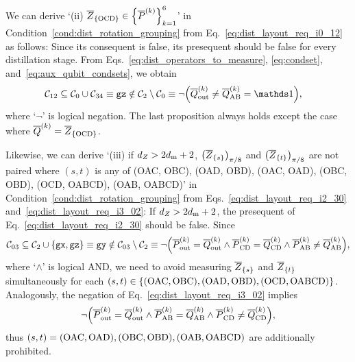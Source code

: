 \documentclass[
 prx,
 reprint,
 superscriptaddress,
 longbibliography,
 dvipsnames
]{revtex4-2}
\begin{document}
\begin{widetext}
We can derive `(ii) $\overline{Z}_\qty{\text{OCD}} \in \qty{\overline{P}^{(k)}}_{k=1}^6$' in Condition~\ref{cond:dist_rotation_grouping} from Eq.~\eqref{eq:dist_layout_req_i0_12} as follows:
Since its consequent is false, its presequent should be false for every distillation stage.
From Eqs.~\eqref{eq:dist_operators_to_measure}, \eqref{eq:condset}, and~\eqref{eq:aux_qubit_condsets}, we obtain
\begin{align*}
    \condsete{12} \subseteq \condsete{0} \cup \condsete{34} &\equiv  \gz \notin \condsete{2}\setminus\condsete{0} \equiv \neg\qty(\lgc{Q}_\mr{out}^{(k)} \neq \lgc{Q}_\mr{AB}^{(k)} = \identity),
\end{align*}
where `$\neg$' is logical negation.
The last proposition always holds except the case where $\overline{Q}^{(k)} = \overline{Z}_\qty{\text{OCD}}$.

Likewise, we can derive `(iii) if ${d_Z} > 2d_{\mathrm{m}} + 2$, $\qty(\overline{Z}_\qty{s})_{\pi/8}$ and $\qty(\overline{Z}_\qty{t})_{\pi/8}$ are not paired where $(s,t)$ is any of (OAC, OBC), (OAD, OBD), (OAC, OAD), (OBC, OBD), (OCD, OABCD), (OAB, OABCD)' in Condition~\ref{cond:dist_rotation_grouping} from Eqs.~\eqref{eq:dist_layout_req_i2_30} and~\eqref{eq:dist_layout_req_i3_02}:
If ${d_Z} > 2d_{\mathrm{m}} + 2$, the presequent of Eq.~\eqref{eq:dist_layout_req_i2_30} should be false.
Since
\begin{align*}
    \mathcal{C}_{03} \subseteq \mathcal{C}_{2} \cup \qty{\texttt{gx}, \texttt{gz}} \equiv \texttt{gy} \notin \mathcal{C}_{03}\setminus\mathcal{C}_{2} \equiv \neg \qty(\overline{P}^{(k)}_{\mathrm{out}} = \overline{Q}^{(k)}_{\mathrm{out}} \land \overline{P}^{(k)}_{\mathrm{CD}} = \overline{Q}^{(k)}_{\mathrm{CD}} \land \overline{P}^{(k)}_{\mathrm{AB}} \neq \overline{Q}^{(k)}_{\mathrm{AB}}),
\end{align*}
where `$\land$' is logical AND, we need to avoid measuring $\overline{Z}_\qty{s}$ and $\overline{Z}_\qty{t}$ simultaneously for each $(s, t) \in \qty{(\mathrm{OAC}, \mathrm{OBC}), (\mathrm{OAD}, \mathrm{OBD}), (\mathrm{OCD}, \mathrm{OABCD})}$.
Analogously, the negation of Eq.~\eqref{eq:dist_layout_req_i3_02} implies
\begin{align*}
    \neg \qty(\overline{P}^{(k)}_{\mathrm{out}} = \overline{Q}^{(k)}_{\mathrm{out}} \land \overline{P}^{(k)}_{\mathrm{AB}} = \overline{Q}^{(k)}_{\mathrm{AB}} \land \overline{P}^{(k)}_{\mathrm{CD}} \neq \overline{Q}^{(k)}_{\mathrm{CD}}),
\end{align*}
thus $(s, t)=(\mathrm{OAC}, \mathrm{OAD}), (\mathrm{OBC}, \mathrm{OBD}), (\mathrm{OAB}, \mathrm{OABCD})$ are additionally prohibited.


\end{widetext}
\end{document}
